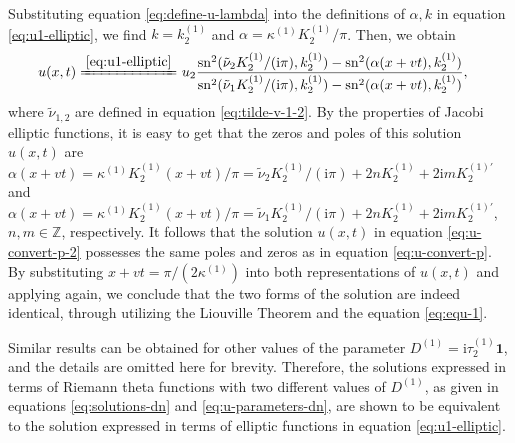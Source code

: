 \documentclass[11pt,reqno]{amsart}
\newcommand{\ii}{\mathrm{i}}
\newcommand{\sn}{\mathrm{sn}}
\numberwithin{equation}{section}
\begin{document}
\begin{proof-prop-equivalent}
	Substituting equation \eqref{eq:define-u-lambda} into the definitions of $\alpha,k$ in equation \eqref{eq:u1-elliptic}, we find $k=  k^{(1)}_2$ and $\alpha= \kappa^{(1)}   K^{(1)}_2/\pi$. 
	Then, we obtain 
	\begin{equation}\label{eq:u-convert-p-2}
		\begin{split}
			u(x,t)\xlongequal{\eqref{eq:u1-elliptic}} 
			&\ u_2\frac{\sn^2(\tilde{\nu}_2 K_2^{(1)}/(\ii \pi) ,k^{(1)}_2)-\sn^2(\alpha (x+vt),k^{(1)}_2)}{\sn^2(\tilde{\nu}_1 K_2^{(1)}/(\ii \pi) ,k^{(1)}_2)-\sn^2(\alpha (x+vt),k^{(1)}_2)},
		\end{split}
	\end{equation}
	where $\tilde{\nu}_{1,2}$ are defined in equation \eqref{eq:tilde-v-1-2}.
	By the properties of Jacobi elliptic functions, it is easy to get that the zeros and poles of this solution $u(x,t)$ are
	$\alpha (x+vt)= \kappa^{(1)} K^{(1)}_2 (x+vt)/\pi=\tilde{\nu}_2 K_2^{(1)}/(\ii \pi)+2nK^{(1)}_2+2\ii m K^{(1)\prime}_2$ and $\alpha (x+vt)= \kappa^{(1)} K^{(1)}_2 (x+vt)/\pi=\tilde{\nu}_1 K_2^{(1)}/(\ii \pi)+2nK^{(1)}_2+2\ii m K^{(1)\prime}_2$, $n,m\in \mathbb{Z}$, respectively.	
	It follows that the solution $u(x,t)$ in equation \eqref{eq:u-convert-p-2} possesses the same poles and zeros as in equation \eqref{eq:u-convert-p}. 
	By substituting $x+vt=\pi/(2\kappa^{(1)})$ into both representations of $u(x,t)$ and applying  again, we conclude that the two forms of the solution are indeed identical, through utilizing the Liouville Theorem and the equation \eqref{eq:equ-1}.
	
	Similar results can be obtained for other values of the parameter $D^{(1)}=\ii   \tau^{(1)}_2 \mathbf{1}$, and the details are omitted here for brevity.
	Therefore, the solutions expressed in terms of Riemann theta functions with two different values of $D^{(1)}$, as given in equations \eqref{eq:solutions-dn} and \eqref{eq:u-parameters-dn}, are shown to be equivalent to the solution expressed in terms of elliptic functions in equation \eqref{eq:u1-elliptic}.
	

\end{proof-prop-equivalent}
\end{document}
